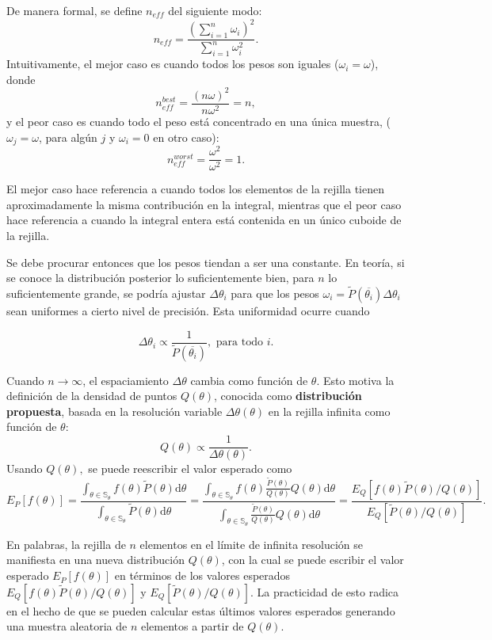 	De manera formal, se define $n_{eff}$ del siguiente modo\cite{kish_1995}:
	\begin{equation}
		n_{eff}=\frac{\left(\sum_{i=1}^n \omega_i \right)^2}{\sum_{i=1}^n\omega_i^2}.
	\end{equation}
	Intuitivamente, el mejor caso es cuando todos los pesos son iguales ($\omega_i=\omega$), donde
	$$n^{best}_{eff}=\frac{(n\omega)^2}{n\omega^2}=n,$$
	y el peor caso es cuando todo el peso está concentrado en una única muestra, ($\omega_j=\omega$, para algún $j$ y $\omega_i=0$ en otro caso):
	$$n^{worst}_{eff}=\frac{\omega^2}{\omega^2}=1.$$
	
	El mejor caso hace referencia a cuando todos los elementos de la rejilla tienen aproximadamente la misma contribución en la integral, mientras que el peor caso hace referencia a cuando la integral entera está contenida en un único cuboide de la rejilla.
	
	Se debe procurar entonces que los pesos tiendan a ser una constante. En teoría, si se conoce la distribución posterior lo suficientemente bien, para $n$ lo suficientemente grande, se podría ajustar $\Delta\theta_i$ para que los pesos $\omega_i=\tilde{P}(\overline{\theta_i})\Delta\theta_i$ sean uniformes a cierto nivel de precisión. Esta uniformidad ocurre cuando
	
	$$\Delta\theta_i \propto \frac{1}{\tilde{P}(\overline{\theta_i})}, \text{ para todo } i.$$
	
	Cuando $n\rightarrow \infty$, el espaciamiento $\Delta\theta$ cambia como función de $\theta$. Esto motiva la definición de la densidad de puntos $Q(\theta)$, conocida como \textbf{distribución propuesta}, basada en la resolución variable $\Delta\theta(\theta)$ en la rejilla infinita como función de $\theta$:
	$$Q(\theta) \propto \frac{1}{\Delta\theta(\theta)}.$$
	Usando $Q(\theta),$ se puede reescribir el valor esperado como
	$$E_P[f(\theta)]=\frac{\int_{\theta\in\mathbb{S}_\theta} f(\theta) \tilde{P}(\theta)\mathrm{d}\theta}{\int_{\theta\in\mathbb{S}_\theta} \tilde{P}(\theta)\mathrm{d}\theta}=\frac{\int_{\theta\in\mathbb{S}_\theta} f(\theta) \frac{\tilde{P}(\theta)}{Q(\theta)} Q(\theta)\mathrm{d}\theta}{\int_{\theta\in\mathbb{S}_\theta} \frac{\tilde{P}(\theta)}{Q(\theta)} Q(\theta)\mathrm{d}\theta}=\frac{E_Q[f(\theta)\tilde{P}(\theta)/Q(\theta)]}{E_Q[\tilde{P}(\theta)/Q(\theta)]}.$$
	
	En palabras, la rejilla de $n$ elementos en el límite de infinita resolución se manifiesta en una nueva distribución $Q(\theta)$, con la cual se puede escribir el valor esperado $E_P[f(\theta)]$ en términos de los valores esperados $E_Q[f(\theta)\tilde{P}(\theta)/Q(\theta)]$ y $E_Q[\tilde{P}(\theta)/Q(\theta)]$. La practicidad de esto radica en el hecho de que se pueden calcular estas últimos valores esperados generando una muestra aleatoria de $n$ elementos a partir de $Q(\theta)$.
	
